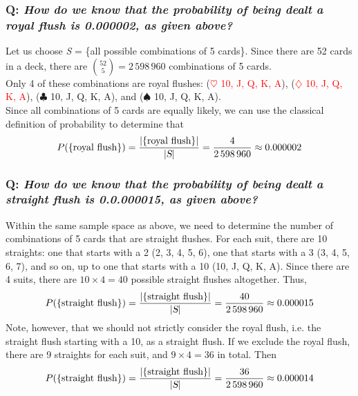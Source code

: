 \documentclass{article}
\begin{document}
\subsubsection*{Q: {\em How do we know that the probability of being dealt a royal flush is 0.000002, as given above?}}
Let us choose \textsl{S} = \{all possible combinations of 5 cards\}. Since there are 52 cards in a deck, there are $\binom{52}{5}=2\,598\,960$ combinations of 5 cards.\\[1ex]
Only 4 of these combinations are royal flushes: (\textcolor{red}{$\heartsuit$ 10, J, Q, K, A}), (\textcolor{red}{$\diamondsuit$ 10, J, Q, K, A}), ($\clubsuit$ 10, J, Q, K, A), and ($\spadesuit$ 10, J, Q, K, A).\\[1ex]
Since all combinations of 5 cards are equally likely, we can use the classical definition of probability to determine that
\begin{equation*}
P(\{\text{royal flush}\})=\dfrac{|\{\text{royal flush}\}|}{|\textsl{S}|}=\dfrac{4}{2\,598\,960}\approx 0.000002
\end{equation*}

\subsubsection*{Q: {\em How do we know that the probability of being dealt a straight flush is 0.0.000015, as given above?}}
Within the same sample space as above, we need to determine the number of combinations of 5 cards that are straight flushes. For each suit, there are 10 straights: one that starts with a 2 (2, 3, 4, 5, 6), one that starts with a 3 (3, 4, 5, 6, 7), and so on, up to one that starts with a 10 (10, J, Q, K, A). Since there are 4 suits, there are $10\times 4=40$ possible straight flushes altogether. Thus,
\begin{equation*}
P(\{\text{straight flush}\})=\dfrac{|\{\text{straight flush}\}|}{|\textsl{S}|}=\dfrac{40}{2\,598\,960}\approx 0.000015
\end{equation*}
Note, however, that we should not strictly consider the royal flush, i.e. the straight flush starting with a 10, as a straight flush. If we exclude the royal flush, there are 9 straights for each suit, and $9\times 4=36$ in total. Then
\begin{equation*}
P(\{\text{straight flush}\})=\dfrac{|\{\text{straight flush}\}|}{|\textsl{S}|}=\dfrac{36}{2\,598\,960}\approx 0.000014
\end{equation*}
\end{document}
